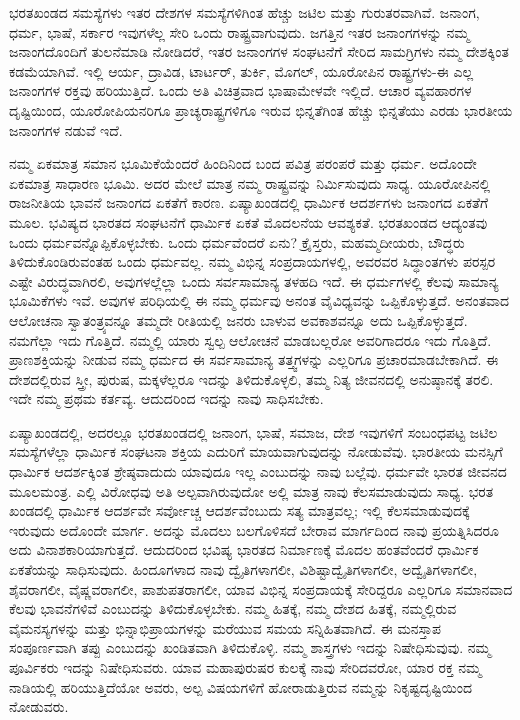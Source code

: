 ಭರತಖಂಡದ ಸಮಸ್ಯೆಗಳು ಇತರ ದೇಶಗಳ ಸಮಸ್ಯೆಗಳಿಗಿಂತ ಹೆಚ್ಚು ಜಟಿಲ ಮತ್ತು ಗುರುತರವಾಗಿವೆ. ಜನಾಂಗ, ಧರ್ಮ, ಭಾಷೆ, ಸರ್ಕಾರ ಇವುಗಳೆಲ್ಲ ಸೇರಿ ಒಂದು ರಾಷ್ಟ್ರವಾಗುವುದು. ಜಗತ್ತಿನ ಇತರ ಜನಾಂಗಗಳನ್ನು ನಮ್ಮ ಜನಾಂಗದೊಂದಿಗೆ ತುಲನೆಮಾಡಿ ನೋಡಿದರೆ, ಇತರ ಜನಾಂಗಗಳ ಸಂಘಟನೆಗೆ ಸೇರಿದ ಸಾಮಗ್ರಿಗಳು ನಮ್ಮ ದೇಶಕ್ಕಿಂತ ಕಡಮೆಯಾಗಿವೆ. ಇಲ್ಲಿ ಆರ್ಯ, ದ್ರಾವಿಡ, ಟಾರ್ಟರ್​, ತುರ್ಕಿ, ಮೊಗಲ್​, ಯೂರೋಪಿನ ರಾಷ್ಟ್ರಗಳು-ಈ ಎಲ್ಲ ಜನಾಂಗಗಳ ರಕ್ತವು ಹರಿಯುತ್ತಿದೆ. ಒಂದು ಅತಿ ವಿಚಿತ್ರವಾದ ಭಾಷಾಮೇಳವೇ ಇಲ್ಲಿದೆ. ಆಚಾರ ವ್ಯವಹಾರಗಳ ದೃಷ್ಟಿಯಿಂದ, ಯೂರೋಪಿಯನರಿಗೂ ಪ್ರಾಚ್ಯರಾಷ್ಟ್ರಗಳಿಗೂ ಇರುವ ಭಿನ್ನತೆಗಿಂತ ಹೆಚ್ಚು ಭಿನ್ನತೆಯು ಎರಡು ಭಾರತೀಯ ಜನಾಂಗಗಳ ನಡುವೆ ಇದೆ.

ನಮ್ಮ ಏಕಮಾತ್ರ ಸಮಾನ ಭೂಮಿಕೆಯೆಂದರೆ ಹಿಂದಿನಿಂದ ಬಂದ ಪವಿತ್ರ ಪರಂಪರೆ ಮತ್ತು ಧರ್ಮ. ಅದೊಂದೇ ಏಕಮಾತ್ರ ಸಾಧಾರಣ ಭೂಮಿ. ಅದರ ಮೇಲೆ ಮಾತ್ರ ನಮ್ಮ ರಾಷ್ಟ್ರವನ್ನು ನಿರ್ಮಿಸುವುದು ಸಾಧ್ಯ. ಯೂರೋಪಿನಲ್ಲಿ ರಾಜನೀತಿಯ ಭಾವನೆ ಜನಾಂಗದ ಏಕತೆಗೆ ಕಾರಣ. ಏಷ್ಯಾಖಂಡದಲ್ಲಿ ಧಾರ್ಮಿಕ ಆದರ್ಶಗಳು ಜನಾಂಗದ ಏಕತೆಗೆ ಮೂಲ. ಭವಿಷ್ಯದ ಭಾರತದ ಸಂಘಟನೆಗೆ ಧಾರ್ಮಿಕ ಏಕತೆ ಮೊದಲನೆಯ ಆವಶ್ಯಕತೆ. ಭರತಖಂಡದ ಆದ್ಯಂತವು ಒಂದು ಧರ್ಮವನ್ನೊಪ್ಪಿಕೊಳ್ಳಬೇಕು. ಒಂದು ಧರ್ಮವೆಂದರೆ ಏನು? ಕ್ರೈಸ್ತರು, ಮಹಮ್ಮದೀಯರು, ಬೌದ್ಧರು ತಿಳಿದುಕೊಂಡಿರುವಂತಹ ಒಂದು ಧರ್ಮವಲ್ಲ. ನಮ್ಮ ವಿಭಿನ್ನ ಸಂಪ್ರದಾಯಗಳಲ್ಲಿ, ಅವರವರ ಸಿದ್ಧಾಂತಗಳು ಪರಸ್ಪರ ಎಷ್ಟೇ ವಿರುದ್ಧವಾಗಿರಲಿ, ಅವುಗಳಲ್ಲೆಲ್ಲಾ ಒಂದು ಸರ್ವಸಾಮಾನ್ಯ ತಳಹದಿ ಇದೆ. ಈ ಧರ್ಮಗಳಲ್ಲಿ ಕೆಲವು ಸಾಮಾನ್ಯ ಭೂಮಿಕೆಗಳು ಇವೆ. ಅವುಗಳ ಪರಿಧಿಯಲ್ಲಿ ಈ ನಮ್ಮ ಧರ್ಮವು ಅನಂತ ವೈವಿಧ್ಯವನ್ನು ಒಪ್ಪಿಕೊಳ್ಳುತ್ತದೆ. ಅನಂತವಾದ ಆಲೋಚನಾ ಸ್ವಾತಂತ್ರ್ಯವನ್ನೂ ತಮ್ಮದೇ ರೀತಿಯಲ್ಲಿ ಜನರು ಬಾಳುವ ಅವಕಾಶವನ್ನೂ ಅದು ಒಪ್ಪಿಕೊಳ್ಳುತ್ತದೆ. ನಮಗೆಲ್ಲಾ ಇದು ಗೊತ್ತಿದೆ. ನಮ್ಮಲ್ಲಿ ಯಾರು ಸ್ವಲ್ಪ ಆಲೋಚನೆ ಮಾಡಬಲ್ಲರೋ ಅವರಿಗಾದರೂ ಇದು ಗೊತ್ತಿದೆ. ಪ್ರಾಣಶಕ್ತಿಯನ್ನು ನೀಡುವ ನಮ್ಮ ಧರ್ಮದ ಈ ಸರ್ವಸಾಮಾನ್ಯ ತತ್ತ್ವಗಳನ್ನು ಎಲ್ಲರಿಗೂ ಪ್ರಚಾರಮಾಡಬೇಕಾಗಿದೆ. ಈ ದೇಶದಲ್ಲಿರುವ ಸ್ತ್ರೀ, ಪುರುಷ, ಮಕ್ಕಳೆಲ್ಲರೂ ಇದನ್ನು ತಿಳಿದುಕೊಳ್ಳಲಿ, ತಮ್ಮ ನಿತ್ಯ ಜೀವನದಲ್ಲಿ ಅನುಷ್ಠಾನಕ್ಕೆ ತರಲಿ. ಇದೇ ನಮ್ಮ ಪ್ರಥಮ ಕರ್ತವ್ಯ. ಆದುದರಿಂದ ಇದನ್ನು ನಾವು ಸಾಧಿಸಬೇಕು.

ಏಷ್ಯಾಖಂಡದಲ್ಲಿ, ಅದರಲ್ಲೂ ಭರತಖಂಡದಲ್ಲಿ ಜನಾಂಗ, ಭಾಷೆ, ಸಮಾಜ, ದೇಶ ಇವುಗಳಿಗೆ ಸಂಬಂಧಪಟ್ಟ ಜಟಿಲ ಸಮಸ್ಯೆಗಳೆಲ್ಲಾ ಧಾರ್ಮಿಕ ಸಂಘಟನಾ ಶಕ್ತಿಯ ಎದುರಿಗೆ ಮಾಯವಾಗುವುದನ್ನು ನೋಡುವೆವು. ಭಾರತೀಯ ಮನಸ್ಸಿಗೆ ಧಾರ್ಮಿಕ ಆದರ್ಶಕ್ಕಿಂತ ಶ್ರೇಷ್ಠವಾದುದು ಯಾವುದೂ ಇಲ್ಲ ಎಂಬುದನ್ನು ನಾವು ಬಲ್ಲೆವು. ಧರ್ಮವೇ ಭಾರತ ಜೀವನದ ಮೂಲಮಂತ್ರ. ಎಲ್ಲಿ ವಿರೋಧವು ಅತಿ ಅಲ್ಪವಾಗಿರುವುದೋ ಅಲ್ಲಿ ಮಾತ್ರ ನಾವು ಕೆಲಸಮಾಡುವುದು ಸಾಧ್ಯ. ಭರತ ಖಂಡದಲ್ಲಿ ಧಾರ್ಮಿಕ ಆದರ್ಶವೇ ಸರ್ವೋಚ್ಚ ಆದರ್ಶವೆಂಬುದು ಸತ್ಯ ಮಾತ್ರವಲ್ಲ; ಇಲ್ಲಿ ಕೆಲಸಮಾಡುವುದಕ್ಕೆ ಇರುವುದು ಅದೊಂದೇ ಮಾರ್ಗ. ಅದನ್ನು ಮೊದಲು ಬಲಗೊಳಿಸದೆ ಬೇರಾವ ಮಾರ್ಗದಿಂದ ನಾವು ಪ್ರಯತ್ನಿಸಿದರೂ ಅದು ವಿನಾಶಕಾರಿಯಾಗುತ್ತದೆ. ಆದುದರಿಂದ ಭವಿಷ್ಯ ಭಾರತದ ನಿರ್ಮಾಣಕ್ಕೆ ಮೊದಲ ಹಂತವೆಂದರೆ ಧಾರ್ಮಿಕ ಏಕತೆಯನ್ನು ಸಾಧಿಸುವುದು. ಹಿಂದೂಗಳಾದ ನಾವು ದ್ವೈತಿಗಳಾಗಲೀ, ವಿಶಿಷ್ಟಾದ್ವೈತಿಗಳಾಗಲೀ, ಅದ್ವೈತಿಗಳಾಗಲೀ, ಶೈವರಾಗಲೀ, ವೈಷ್ಣವರಾಗಲೀ, ಪಾಶುಪತರಾಗಲೀ, ಯಾವ ವಿಭಿನ್ನ ಸಂಪ್ರದಾಯಕ್ಕೆ ಸೇರಿದ್ದರೂ ಎಲ್ಲರಿಗೂ ಸಮಾನವಾದ ಕೆಲವು ಭಾವನೆಗಳಿವೆ ಎಂಬುದನ್ನು ತಿಳಿದುಕೊಳ್ಳಬೇಕು. ನಮ್ಮ ಹಿತಕ್ಕೆ, ನಮ್ಮ ದೇಶದ ಹಿತಕ್ಕೆ, ನಮ್ಮಲ್ಲಿರುವ ವೈಮನಸ್ಯಗಳನ್ನು ಮತ್ತು ಭಿನ್ನಾಭಿಪ್ರಾಯಗಳನ್ನು ಮರೆಯುವ ಸಮಯ ಸನ್ನಿಹಿತವಾಗಿದೆ. ಈ ಮನಸ್ತಾಪ ಸಂಪೂರ್ಣವಾಗಿ ತಪ್ಪು ಎಂಬುದನ್ನು ಖಂಡಿತವಾಗಿ ತಿಳಿದುಕೊಳ್ಳಿ. ನಮ್ಮ ಶಾಸ್ತ್ರಗಳು ಇದನ್ನು ನಿಷೇಧಿಸುವುವು. ನಮ್ಮ ಪೂರ್ವಿಕರು ಇದನ್ನು ನಿಷೇಧಿಸುವರು. ಯಾವ ಮಹಾಪುರುಷರ ಕುಲಕ್ಕೆ ನಾವು ಸೇರಿದವರೋ, ಯಾರ ರಕ್ತ ನಮ್ಮ ನಾಡಿಯಲ್ಲಿ ಹರಿಯುತ್ತಿದೆಯೋ ಅವರು, ಅಲ್ಪ ವಿಷಯಗಳಿಗೆ ಹೋರಾಡುತ್ತಿರುವ ನಮ್ಮನ್ನು ನಿಕೃಷ್ಟದೃಷ್ಟಿಯಿಂದ ನೋಡುವರು.

